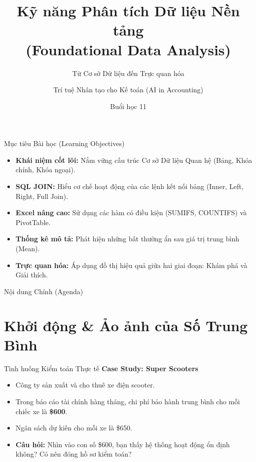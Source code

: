 \documentclass[aspectratio=169,12pt]{beamer}
\title[AI trong Kế toán - Buổi 11]{Kỹ năng Phân tích Dữ liệu Nền tảng\\(Foundational Data Analysis)}
\subtitle{Từ Cơ sở Dữ liệu đến Trực quan hóa}
\author[Giảng viên]{Trí tuệ Nhân tạo cho Kế toán (AI in Accounting)}
\institute[Đại học]{Khoa Kế toán - Kiểm toán}
\date{Buổi học 11}
\begin{document}
\begin{frame}
    \titlepage
\end{frame}

\begin{frame}{Mục tiêu Bài học (Learning Objectives)}
    \begin{itemize}
        \item \textbf{Khái niệm cốt lõi:} Nắm vững cấu trúc Cơ sở Dữ liệu Quan hệ (Bảng, Khóa chính, Khóa ngoại).
        \item \textbf{SQL JOIN:} Hiểu cơ chế hoạt động của các lệnh kết nối bảng (Inner, Left, Right, Full Join).
        \item \textbf{Excel nâng cao:} Sử dụng các hàm có điều kiện (SUMIFS, COUNTIFS) và PivotTable.
        \item \textbf{Thống kê mô tả:} Phát hiện những bất thường ẩn sau giá trị trung bình (Mean).
        \item \textbf{Trực quan hóa:} Áp dụng đồ thị hiệu quả giữa hai giai đoạn: Khám phá và Giải thích.
    \end{itemize}
\end{frame}

\begin{frame}{Nội dung Chính (Agenda)}
    \tableofcontents
\end{frame}

\section{Khởi động \& Ảo ảnh của Số Trung Bình}
\begin{frame}
    \tableofcontents[currentsection]
\end{frame}

\begin{frame}{Tình huống Kiểm toán Thực tế}
    \textbf{Case Study: Super Scooters}
    \begin{itemize}
        \item Công ty sản xuất và cho thuê xe điện scooter.
        \item Trong báo cáo tài chính hàng tháng, chi phí bảo hành trung bình cho mỗi chiếc xe là \textbf{\$600}.
        \item Ngân sách dự kiến cho mỗi xe là \$650.
        \item \textbf{Câu hỏi:} Nhìn vào con số \$600, bạn thấy hệ thống hoạt động ổn định không? Có nên đóng hồ sơ kiểm toán?
    \end{itemize}
\end{frame}
\end{document}
